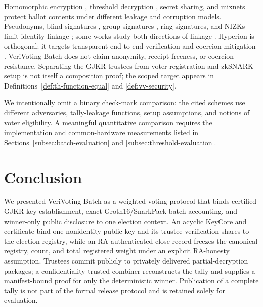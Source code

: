 \documentclass[pdflatex,sn-mathphys-num]{sn-jnl}%
\theoremstyle{thmstyleone}%
\theoremstyle{thmstyletwo}%
\theoremstyle{thmstylethree}%
\begin{document}
Homomorphic encryption \cite{bib84}, threshold decryption \cite{bib85}, secret
sharing, and mixnets \cite{bib86,bib87,bib88,bib89,bib90,bib91,bib92,bib93,bib94}
protect ballot contents under different leakage and corruption models.
Pseudonyms, blind signatures \cite{bib101}, group signatures \cite{bib102},
ring signatures, and NIZKs limit identity linkage
\cite{bib95,bib96,bib97,bib98,bib99,bib100}; some works study both directions
of linkage \cite{bib95,bib103,bib104,bib105}. Hyperion is orthogonal: it
targets transparent end-to-end verification and coercion mitigation
\cite{bib131}. VeriVoting-Batch does not claim anonymity, receipt-freeness, or
coercion resistance. Separating the GJKR trustees from voter registration and
zkSNARK setup is not itself a composition proof; the scoped target appears in
Definitions~\ref{def:th-function-equal} and \ref{def:vv-security}.

We intentionally omit a binary check-mark comparison: the cited schemes use
different adversaries, tally-leakage functions, setup assumptions, and notions
of voter eligibility.  A meaningful quantitative comparison requires the
implementation and common-hardware measurements listed in
Sections~\ref{subsec:batch-evaluation} and \ref{subsec:threshold-evaluation}.





\section{Conclusion}\label{sec8}

We presented VeriVoting-Batch as a weighted-voting protocol that binds
certified GJKR key establishment, exact Groth16/SnarkPack batch accounting, and
winner-only public disclosure to one election context.  An acyclic KeyCore and
certificate bind one nonidentity public key and its trustee verification
shares to the election registry, while an RA-authenticated close record
freezes the canonical registry, count, and total registered weight under an
explicit RA-honesty assumption.  Trustees commit publicly to privately
delivered partial-decryption packages; a confidentiality-trusted combiner
reconstructs the tally and supplies a manifest-bound proof for only the
deterministic winner.  Publication of a complete tally is not part of the
formal release protocol and is retained solely for evaluation.
\end{document}
